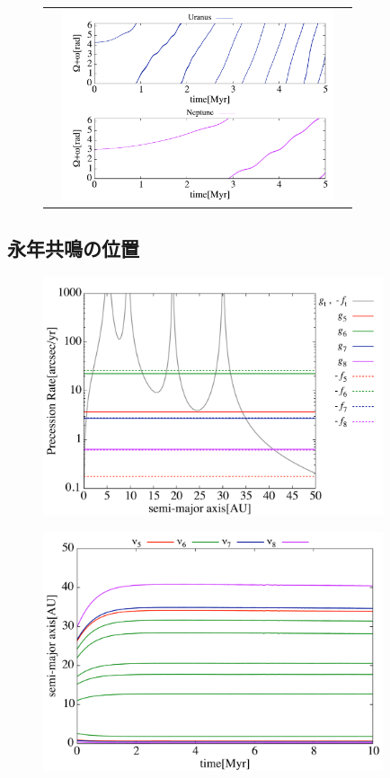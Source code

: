 \documentclass[11pt,a4paper,oneside,onecolumn]{jarticle}
\begin{document}
\begin{figure}[H]
\begin{tabular}{ccc}
\begin{minipage}[t]{0.1\hsize}
\end{minipage} &
\begin{minipage}[t]{0.45\hsize}
\centering
\includegraphics[width=8cm]{./image/Move500kyr_curlypi_5Myr_URANEP.pdf}
\end{minipage}
%
\end{tabular}
\caption{\label{}}
\end{figure}



\subsection{永年共鳴の位置}

\begin{figure}[H]
\centering
\includegraphics[width=10cm]{./image/PrecessionRate_logAB.pdf}
\caption{\label{}}
\end{figure}

\begin{figure}[H]
\centering
\includegraphics[width=10cm]{./image/SecularResonanceAxis_ecc.pdf}
\caption{\label{}}
\end{figure}
\end{document}
